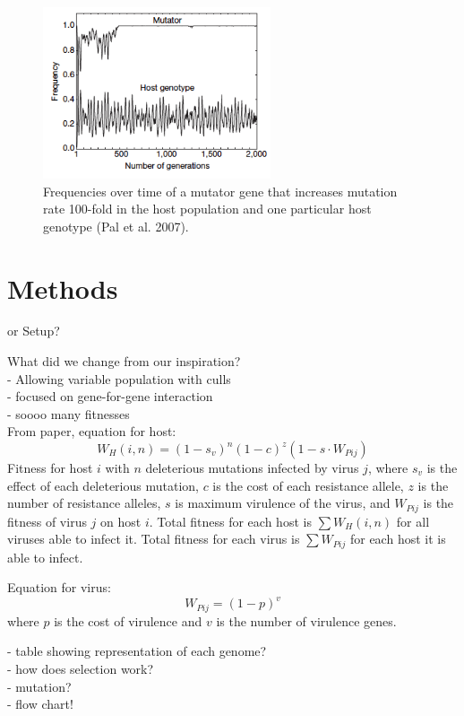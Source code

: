 \documentclass[11pt, oneside]{article}
\begin{document}
\begin{figure}[H]
	\centering
	\includegraphics[width=0.6\textwidth]{figure2.png}
	\caption{Frequencies over time of a mutator gene that increases mutation rate 100-fold in the host population and one particular host genotype (Pal et al. 2007).}
\end{figure}

\section{Methods}
or Setup? 

What did we change from our inspiration?
\\- Allowing variable population with culls
\\- focused on gene-for-gene interaction
\\- soooo many fitnesses\\From paper, equation for host:
\begin{equation}
W_{H}(i,n) = (1-s_{v})^n(1-c)^z(1-s\cdot W_{Pij})
\end{equation}
Fitness for host $i$ with $n$ deleterious mutations infected by virus $j$, where $s_{v}$ is the effect of each deleterious mutation, $c$ is the cost of each resistance allele, $z$ is the number of resistance alleles, $s$ is maximum virulence of the virus, and $W_{Pij}$ is the fitness of virus $j$ on host $i$. Total fitness for each host is $\sum W_{H}(i,n)$ for all viruses able to infect it. Total fitness for each virus is $\sum W_{Pij}$ for each host it is able to infect. 

Equation for virus:
\begin{equation}
W_{Pij} = (1-p)^v
\end{equation}
where $p$ is the cost of virulence and $v$ is the number of virulence genes.

- table showing representation of each genome?
\\- how does selection work?
\\- mutation?
\\- flow chart!
\end{document}
